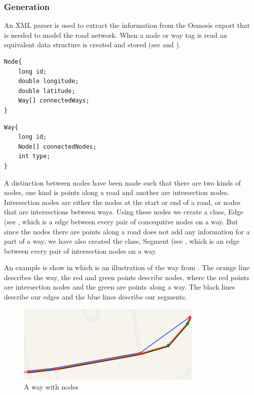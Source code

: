 \subsubsection{Generation}
An XML parser is used to extract the information from the Osmosis export that is needed to model the road network. When a node or way tag is read an equivalent data structure is created and stored (see  and ).

\begin{lstlisting}[style=java, caption=Datastructure for a node, label=lst:node]
Node{
	long id;
	double longitude;
	double latitude;
	Way[] connectedWays;
}
\end{lstlisting}

\begin{lstlisting}[style=java, caption=Datastructure for a way, label=lst:way]
Way{
	long id;
	Node[] connectedNodes;
	int type;
}
\end{lstlisting}

A distinction between nodes have been made such that there are two kinds of nodes, one kind is points along a road and another are intersection nodes. Intersection nodes are either the nodes at the start or end of a road, or nodes that are intersections between ways. Using these nodes we create a class, Edge (see , which is a edge between every pair of concequtive nodes on a way. But since the nodes there are points along a road does not add any information for a part of a way, we have also created the class, Segment (see , which is an edge between every pair of intersection nodes on a way.

An example is show in  which is an illustration of the way from . The orange line describes the way, the red and green points describe nodes, where the red points are intersection nodes and the green are points along a way. The black lines describe our edges and the blue lines describe our segments.

\begin{figure}[h!]
  \centering
    \includegraphics[width=0.8\textwidth]{figures/way-w-nodes2.png}
    \caption{A way with nodes}
    \label{fig:waywithnodes}
\end{figure}


